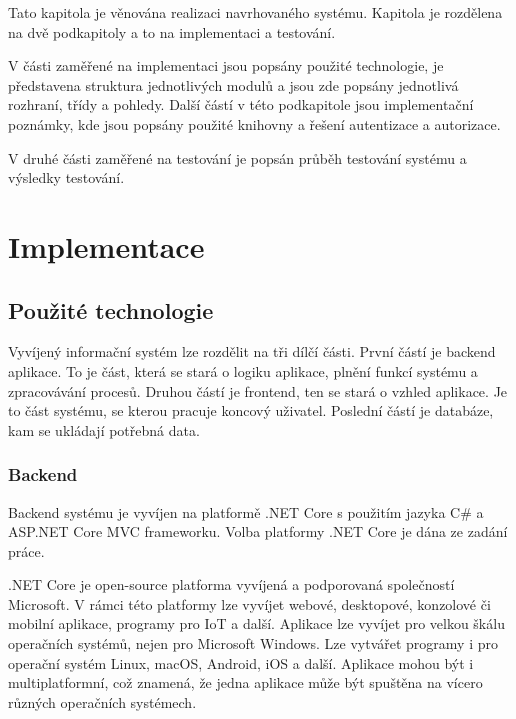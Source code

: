 Tato kapitola je věnována realizaci navrhovaného systému. Kapitola je rozdělena na dvě podkapitoly a to na implementaci a testování.

V části zaměřené na implementaci jsou popsány použité technologie, je představena struktura jednotlivých modulů a jsou zde popsány jednotlivá rozhraní, třídy a pohledy. Další částí v této podkapitole jsou implementační poznámky, kde jsou popsány použité knihovny a řešení autentizace a autorizace.

V druhé části zaměřené na testování je popsán průběh testování systému a výsledky testování.

\section{Implementace}

\subsection{Použité technologie}
Vyvíjený informační systém lze rozdělit na tři dílčí části. První částí je backend aplikace. To je část, která se stará o logiku aplikace, plnění funkcí systému a zpracovávání procesů. Druhou částí je frontend, ten se stará o vzhled aplikace. Je to část systému, se kterou pracuje koncový uživatel. Poslední částí je databáze, kam se ukládají potřebná data.

\subsubsection{Backend}
Backend systému je vyvíjen na platformě .NET Core s použitím jazyka C\# a ASP.NET Core MVC frameworku. Volba platformy .NET Core je dána ze zadání práce.

.NET Core je open-source platforma vyvíjená a podporovaná společností Microsoft. V rámci této platformy lze vyvíjet webové, desktopové, konzolové či mobilní aplikace, programy pro IoT a další. Aplikace lze vyvíjet pro velkou škálu operačních systémů, nejen pro Microsoft Windows. Lze vytvářet programy i pro operační systém Linux, macOS, Android, iOS a další. Aplikace mohou být i multiplatformní, což znamená, že jedna aplikace může být spuštěna na vícero různých operačních systémech. \cite{net-introduction} 

